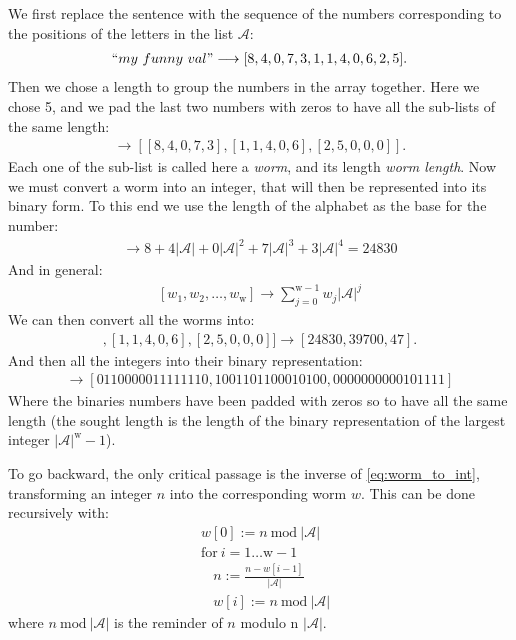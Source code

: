\noindent
We first replace the sentence with the sequence of the numbers corresponding to the positions of the letters in the list $\mathcal{A}$:
\begin{align*}
   ``my~funny~val" \longrightarrow [8, 4, 0, 7, 3, 1, 1, 4, 0, 6, 2, 5].
\end{align*}
Then we chose a length to group the numbers in the array together. Here we chose 5, and we pad the last two numbers with zeros to have all the sub-lists of the same length:
\begin{align*}
   [8, 4, 0, 7, 3, 1, 1, 4, 0, 6, 2, 5] \longrightarrow [[8, 4, 0, 7, 3], [1, 1, 4, 0, 6], [2, 5, 0, 0, 0]].
\end{align*}
Each one of the sub-list is called here a \emph{worm}, and its length \emph{worm length}. Now we must convert a worm into an integer, that will then be represented into its binary form. To this end we use the length of the alphabet as the base for the number:
\begin{align*}
   [8, 4, 0, 7, 3]
   \longrightarrow
   8 + 4 \vert \mathcal{A}\vert + 0 \vert \mathcal{A}\vert^2 + 7\vert \mathcal{A}\vert^3 + 3\vert \mathcal{A}\vert^4 = 24830
\end{align*}
And in general:
\begin{align}\label{eq:worm_to_int}
   [w_1, w_2, \dots, w_{\text{w}}]
   \longrightarrow
   \sum_{j=0}^{\text{w} - 1} w_j \vert \mathcal{A}\vert^j
\end{align}
We can then convert all the worms into:
\begin{align*}
   [[8, 4, 0, 7, 3], [1, 1, 4, 0, 6], [2, 5, 0, 0, 0]]
   \longrightarrow
   [24830, 39700, 47].
\end{align*}
And then all the integers into their binary representation:
\begin{align*}
   [24830, 39700, 47] \longrightarrow [0110000011111110, 1001101100010100, 0000000000101111]
\end{align*}
Where the binaries numbers have been padded with zeros so to have all the same length (the sought length is the length of the binary representation of the largest integer $\vert \mathcal{A}\vert^{\text{w}} - 1$).

To go backward, the only critical passage is the inverse of \ref{eq:worm_to_int}, transforming an integer $n$ into the corresponding worm $w$. This can be done recursively with:
\begin{align*}
   &w[0] := n ~\text{mod}~ \vert\mathcal{A}\vert \\
   &\text{for}~i=1\dots \text{w}-1\\
   &~~~~ n := \frac{n - w[i-1]}{\vert\mathcal{A}\vert} \\
   &~~~~ w[i] := n ~\text{mod}~ \vert\mathcal{A}\vert
\end{align*}
where $n ~\text{mod}~ \vert\mathcal{A}\vert$ is the reminder of $n$ modulo n $\vert\mathcal{A}\vert$.


